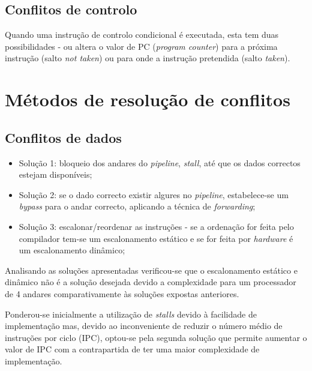\documentclass[11pt]{article}
\numberwithin{equation}{section}
\begin{document}
\subsection{Conflitos de controlo}

Quando uma instrução de controlo condicional é executada, esta tem duas possibilidades - ou altera o valor de PC (\textit{program counter}) para a próxima instrução (salto \textit{not taken}) ou para onde a instrução pretendida (salto \textit{taken}). 

\section{Métodos de resolução de conflitos}

\subsection{Conflitos de dados}

\begin{itemize}
	\item Solução 1: bloqueio dos andares do \textit{pipeline}, \textit{stall}, até que os dados correctos estejam disponíveis;
	\vspace{-2.5mm}
	\item Solução 2: se o dado correcto existir algures no \textit{pipeline}, estabelece-se um \textit{bypass} para o andar correcto, aplicando a técnica de \textit{forwarding};
	\vspace{-2.5mm}
	\item Solução 3: escalonar/reordenar as instruções - se a ordenação for feita pelo compilador tem-se um escalonamento estático e se for feita por \textit{hardware} é um escalonamento dinâmico;
\end{itemize}

\vspace{-1.5mm}

Analisando as soluções apresentadas verificou-se que o escalonamento estático e dinâmico não é a solução desejada devido a complexidade para um processador de 4 andares comparativamente às soluções expostas anteriores. 

Ponderou-se inicialmente a utilização de \textit{stalls} devido à facilidade de implementação mas, devido ao inconveniente de reduzir o número médio de instruções por ciclo (IPC), optou-se pela segunda solução que permite aumentar o valor de IPC com a contrapartida de ter uma maior complexidade de implementação.
\end{document}

